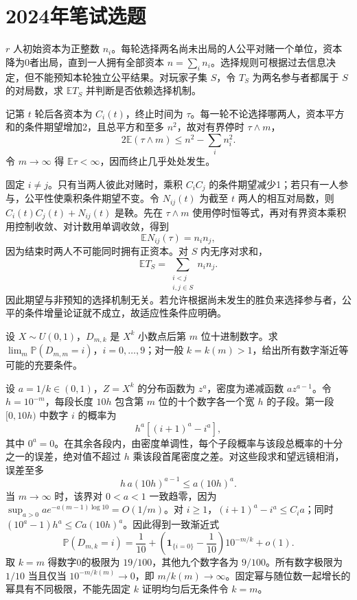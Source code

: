 \documentclass[UTF8,12pt,a4paper,fontset=fandol]{ctexbook}
\newcommand{\E}{\mathbb E}
\newcommand{\PP}{\mathbb P}
\begin{document}
\section{2024年笔试选题}
\begin{example}[原题1：公平多方博弈中内部对局数]\label{yau:2024-1}
$r$ 人初始资本为正整数 $n_i$。每轮选择两名尚未出局的人公平对赌一个单位，资本降为0者出局，直到一人拥有全部资本 $n=\sum_i n_i$。选择规则可根据过去信息决定，但不能预知本轮独立公平结果。对玩家子集 $S$，令 $T_S$ 为两名参与者都属于 $S$ 的对局数，求 $\E T_S$ 并判断是否依赖选择机制。
\end{example}
\begin{solve}
记第 $t$ 轮后各资本为 $C_i(t)$，终止时间为 $\tau$。每一轮不论选择哪两人，资本平方和的条件期望增加2，且总平方和至多 $n^2$，故对有界停时 $\tau\wedge m$，
\[
2\E(\tau\wedge m)\le n^2-\sum_i n_i^2.
\]
令 $m\to\infty$ 得 $\E\tau<\infty$，因而终止几乎处处发生。

固定 $i\ne j$。只有当两人彼此对赌时，乘积 $C_iC_j$ 的条件期望减少1；若只有一人参与，公平性使乘积条件期望不变。令 $N_{ij}(t)$ 为截至 $t$ 两人的相互对局数，则 $C_i(t)C_j(t)+N_{ij}(t)$ 是鞅。先在 $\tau\wedge m$ 使用停时恒等式，再对有界资本乘积用控制收敛、对计数用单调收敛，得到
\[
\E N_{ij}(\tau)=n_in_j,
\]
因为结束时两人不可能同时拥有正资本。对 $S$ 内无序对求和，
\[
\E T_S=\sum_{\substack{i<j\\i,j\in S}}n_in_j.
\]
因此期望与非预知的选择机制无关。若允许根据尚未发生的胜负来选择参与者，公平的条件增量论证就不成立，故适应性条件应明确。
\end{solve}

\begin{example}[原题3：随机幂的小数位极限]\label{yau:2024-3}
设 $X\sim U(0,1)$，$D_{m,k}$ 是 $X^k$ 小数点后第 $m$ 位十进制数字。求 $\lim_m\PP(D_{m,m}=i)$，$i=0,\ldots,9$；对一般 $k=k(m)>1$，给出所有数字渐近等可能的充要条件。
\end{example}
\begin{solve}
设 $a=1/k\in(0,1)$，$Z=X^k$ 的分布函数为 $z^a$，密度为递减函数 $az^{a-1}$。令 $h=10^{-m}$，每段长度 $10h$ 包含第 $m$ 位的十个数字各一个宽 $h$ 的子段。第一段 $[0,10h)$ 中数字 $i$ 的概率为
\[
h^a[(i+1)^a-i^a],
\]
其中 $0^a=0$。在其余各段内，由密度单调性，每个子段概率与该段总概率的十分之一的误差，绝对值不超过 $h$ 乘该段首尾密度之差。对这些段求和望远镜相消，误差至多
\[
h\,a(10h)^{a-1}\le a(10h)^a.
\]
当 $m\to\infty$ 时，该界对 $0<a<1$ 一致趋零，因为 $\sup_{a>0}ae^{-a(m-1)\log10}=O(1/m)$。对 $i\ge1$，$(i+1)^a-i^a\le C_i a$；同时 $(10^a-1)h^a\le C a(10h)^a$。因此得到一致渐近式
\[
\PP(D_{m,k}=i)=\frac1{10}+\left(\mathbf1_{\{i=0\}}-\frac1{10}\right)10^{-m/k}+o(1).
\]
取 $k=m$ 得数字0的极限为 $19/100$，其他九个数字各为 $9/100$。所有数字极限为 $1/10$ 当且仅当 $10^{-m/k(m)}\to0$，即 $m/k(m)\to\infty$。固定幂与随位数一起增长的幂具有不同极限，不能先固定 $k$ 证明均匀后无条件令 $k=m$。
\end{solve}
\end{document}

